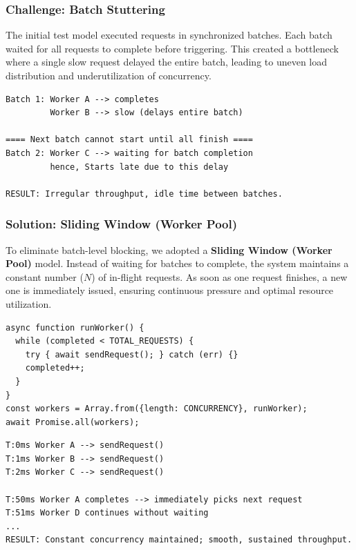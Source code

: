 \documentclass[sigconf]{acmart}
\begin{document}
\subsubsection{Challenge: Batch Stuttering}
The initial test model executed requests in synchronized batches. Each batch waited for all requests to complete before triggering. This created a bottleneck where a single slow request delayed the entire batch, leading to uneven load distribution and underutilization of concurrency.

\begin{lstlisting}[style=logstyle, caption={Batch execution causing stuttering}]
Batch 1: Worker A --> completes
         Worker B --> slow (delays entire batch)

==== Next batch cannot start until all finish ====
Batch 2: Worker C --> waiting for batch completion
         hence, Starts late due to this delay

RESULT: Irregular throughput, idle time between batches.
\end{lstlisting}

\subsubsection{Solution: Sliding Window (Worker Pool)}

To eliminate batch-level blocking, we adopted a \textbf{Sliding Window (Worker Pool)} model. Instead of waiting for batches to complete, the system maintains a constant number ($N$) of in-flight requests. As soon as one request finishes, a new one is immediately issued, ensuring continuous pressure and optimal resource utilization.

\begin{lstlisting}[style=jsstyle, caption={Sliding window worker pool logic (stress-test.cjs)}]
async function runWorker() {
  while (completed < TOTAL_REQUESTS) {
    try { await sendRequest(); } catch (err) {}
    completed++;
  }
}
const workers = Array.from({length: CONCURRENCY}, runWorker);
await Promise.all(workers);
\end{lstlisting}

\begin{lstlisting}[style=logstyle, caption={Sliding window execution (continuous flow)}]
T:0ms Worker A --> sendRequest()
T:1ms Worker B --> sendRequest()
T:2ms Worker C --> sendRequest()

T:50ms Worker A completes --> immediately picks next request
T:51ms Worker D continues without waiting
...
RESULT: Constant concurrency maintained; smooth, sustained throughput.
\end{lstlisting}
\end{document}
